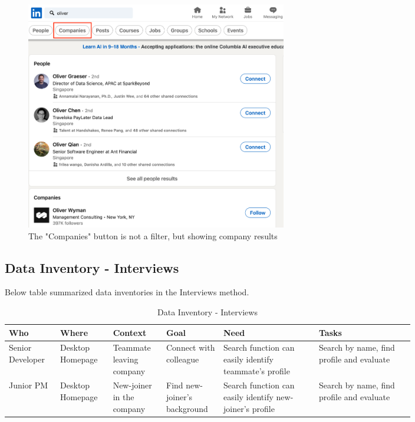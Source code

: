 \documentclass[
	letterpaper, %
]{jdf}
\begin{document}
\begin{figure}[h]
	\centering
	\includegraphics[height=10cm]{Figures/search_people.png}
	\caption{The "Companies" button is not a filter, but showing company results}
	\label{fig:search_people}
\end{figure}

\subsection{Data Inventory - Interviews}
Below table summarized data inventories in the Interviews method.

\begin{table}[h] %
	\caption{Data Inventory - Interviews}
	\small %
	\centering %
	\begin{tabular}{L{0.1\linewidth} L{0.1\linewidth} L{0.1\linewidth} L{0.1\linewidth} L{0.2\linewidth} L{0.2\linewidth}}
		\textbf{Who} & \textbf{Where} & \textbf{Context} & \textbf{Goal} & \textbf{Need} & \textbf{Tasks}\\
		\toprule[0.5pt]
		Senior Developer & Desktop Homepage & Teammate leaving company & Connect with colleague & Search function can easily identify teammate's profile & Search by name, find profile and evaluate\\
		\midrule
		Junior PM & Desktop Homepage & New-joiner in the company & Find new-joiner's background & Search function can easily identify new-joiner's profile & Search by name, find profile and evaluate \\
	\end{tabular}
\end{table}
\end{document}
